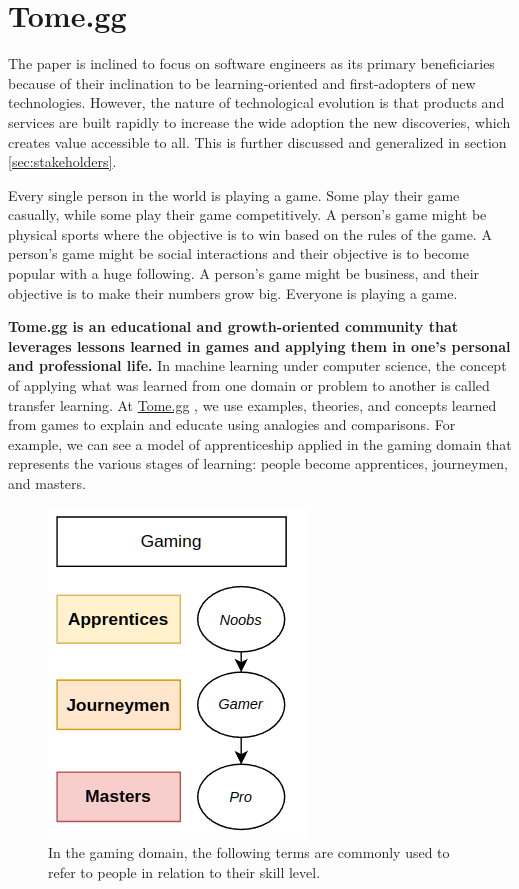 \documentclass[journal, onecolumn]{IEEEtran}
\newcommand{\tomegg}{
  \href{http://tome.gg}{Tome.gg}
}
\begin{document}
\section{Tome.gg}
\label{sec:tomegg}
The paper is inclined to focus on software engineers as its primary beneficiaries because of 
their inclination to be learning-oriented and  first-adopters of new technologies.
However, the nature of technological evolution is that products and services are 
built rapidly to increase the wide adoption the new discoveries, which creates value
accessible to all. This is further discussed and generalized in section \ref{sec:stakeholders}.


Every single person in the world is playing a game. Some play their game casually,
while some play their game competitively. A person's game might be physical sports
where the objective is to win based on the rules of the game. A person's game
might be social interactions and their objective is to become popular with a huge 
following. A person's game might be business, and their objective is to make their 
numbers grow big. Everyone is playing a game.

  \textbf{Tome.gg is an educational and growth-oriented community that leverages
  lessons learned in games and applying them in one's personal and professional life.} 
  In machine learning under computer science, the concept of applying what was 
  learned from one domain or problem to another is called transfer learning\cite{b5}.
  At \tomegg, we use examples, theories, and concepts learned from games to explain
  and educate using analogies and comparisons. 
  For example, we can see a model of apprenticeship\cite{b4} applied in the gaming domain
  that represents the various stages of learning: people become apprentices, 
  journeymen, and masters.

\begin{figure}[t]
  \includegraphics[scale=0.7]{stakeholders-gaming}
  \centering
  \caption{In the gaming domain, the following terms are commonly used to refer 
  to people in relation to their skill level.}
  \label{fig:stakeholders-gaming} 
\end{figure}
\end{document}
